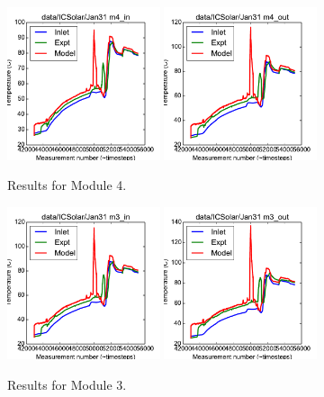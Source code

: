 \documentclass{article}
\begin{document}
\clearpage
\begin{figure}[!ht]
\centering
\includegraphics[width=0.4\textwidth]{../../data/ICSolar/images/Jan31_m4_in_unsteady.pdf}\hspace{0.05\textwidth}
\includegraphics[width=0.4\textwidth]{../../data/ICSolar/images/Jan31_m4_out_unsteady.pdf}\hspace{0.05\textwidth}\\
\caption{Results for Module 4.}\end{figure}
\begin{figure}[!ht]
\centering
\includegraphics[width=0.4\textwidth]{../../data/ICSolar/images/Jan31_m3_in_unsteady.pdf}\hspace{0.05\textwidth}
\includegraphics[width=0.4\textwidth]{../../data/ICSolar/images/Jan31_m3_out_unsteady.pdf}\hspace{0.05\textwidth}\\
\caption{Results for Module 3.}\end{figure}
\end{document}
